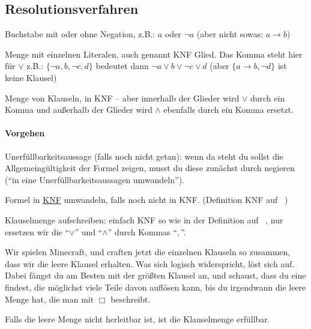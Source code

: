 \documentclass[
    ngerman,
    color=3b,
    summary,
    boxarc,
    main,
    fleqn,
    leqno,
]{rubos-tuda-template}
\begin{document}
    \subsection{Resolutionsverfahren}
    \begin{definition}[Literal]
        Buchstabe mit oder ohne Negation, z.B.: $a$ oder $\lnot a$ (aber nicht sowas: $a\rightarrow{}b$)
    \end{definition}
    \begin{definition}[Klausel]
        Menge mit einzelnen Literalen, auch genannt KNF Glied. Das Komma steht hier für $\lor$ z.B.:
        $\{\lnot a, b,\lnot c, d\}$ bedeutet dann $\lnot a\lor b\lor\lnot c\lor d$ (aber $\{a\rightarrow{}b,\lnot d\}$ ist keine Klausel)
    \end{definition}
    \begin{definition}[Klauselmenge]
        Menge von Klauseln, in KNF -- aber innerhalb der Glieder wird $\lor$ durch ein Komma und außerhalb der Glieder wird $\land$ ebenfalls durch ein Komma ersetzt.
    \end{definition}
    \paragraph{Vorgehen}
    \begin{steps}
        \item Unerfüllbarkeitsaussage (falls noch nicht getan): wenn da steht du sollst die Allgemeingültigkeit der Formel zeigen, musst du diese zunächst durch negieren (\enquote{in eine Unerfüllbarkeitsaussagen umwandeln}).
        \item Formel in \hyperref[knf]{KNF} umwandeln, falls noch nicht in KNF. (Definition KNF auf \pagename~\pageref{knf})
        \item Klauselmenge aufschreiben: einfach KNF so wie in der Definition auf \pagename~\pageref{knf}, nur ersetzen wir die \enquote{$\lor$} und \enquote{$\land$} durch Kommas \enquote{$,$}.
        \item Wir spielen Minecraft, und craften jetzt die einzelnen Klauseln so zusammen, dass wir die leere Klausel erhalten. Was sich logisch widerspricht, löst sich auf. Dabei fängst du am Besten mit der größten Klausel an, und schaust, dass du eine findest, die möglichst viele Teile davon auflösen kann, bis du irgendwann die leere Menge hat, die man mit $\Box$ beschreibt.
        \item Falls die leere Menge nicht herleitbar ist, ist die Klauselmenge erfüllbar.
    \end{steps}
\end{document}
